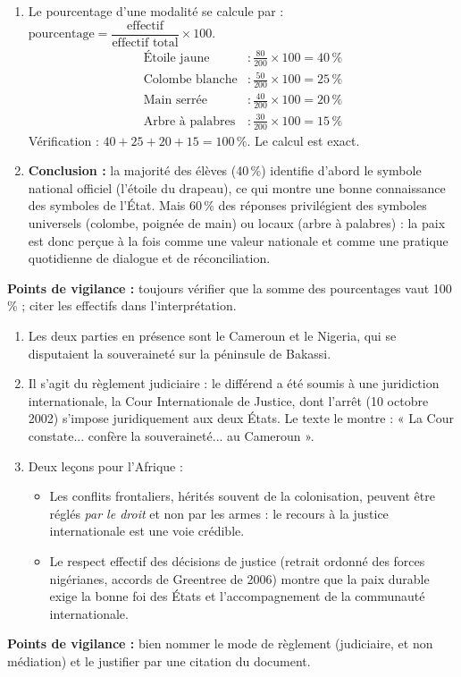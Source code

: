\documentclass[11pt]{article}
\newcommand{\cle}[1]{{\popxbold\color{popdark}#1}}
\begin{document}
\begin{corrige}
\begin{enumerate}
\item Le pourcentage d'une modalité se calcule par : $\text{pourcentage} = \dfrac{\text{effectif}}{\text{effectif total}} \times 100$.
\begin{align*}
\text{Étoile jaune} &: \frac{80}{200} \times 100 = 40\,\% \\
\text{Colombe blanche} &: \frac{50}{200} \times 100 = 25\,\% \\
\text{Main serrée} &: \frac{40}{200} \times 100 = 20\,\% \\
\text{Arbre à palabres} &: \frac{30}{200} \times 100 = 15\,\%
\end{align*}
Vérification : $40 + 25 + 20 + 15 = 100\,\%$. Le calcul est exact.
\item \textbf{Conclusion :} la majorité des élèves (40\,\%) identifie d'abord le symbole national officiel (l'étoile du drapeau), ce qui montre une bonne connaissance des symboles de l'État. Mais 60\,\% des réponses privilégient des symboles universels (colombe, poignée de main) ou locaux (arbre à palabres) : la paix est donc perçue à la fois comme une valeur nationale et comme une pratique quotidienne de dialogue et de réconciliation.
\end{enumerate}
\textbf{Points de vigilance :} toujours vérifier que la somme des pourcentages vaut 100\,\% ; citer les effectifs dans l'interprétation.
\end{corrige}

\begin{corrige}
\begin{enumerate}
\item Les deux parties en présence sont le \cle{Cameroun} et le \cle{Nigeria}, qui se disputaient la souveraineté sur la péninsule de Bakassi.
\item Il s'agit du \cle{règlement judiciaire} : le différend a été soumis à une juridiction internationale, la Cour Internationale de Justice, dont l'arrêt (10 octobre 2002) s'impose juridiquement aux deux États. Le texte le montre : « La Cour constate... confère la souveraineté... au Cameroun ».
\item Deux leçons pour l'Afrique :
\begin{itemize}
\item Les conflits frontaliers, hérités souvent de la colonisation, peuvent être réglés \emph{par le droit} et non par les armes : le recours à la justice internationale est une voie crédible.
\item Le respect effectif des décisions de justice (retrait ordonné des forces nigérianes, accords de Greentree de 2006) montre que la paix durable exige la bonne foi des États et l'accompagnement de la communauté internationale.
\end{itemize}
\end{enumerate}
\textbf{Points de vigilance :} bien nommer le mode de règlement (judiciaire, et non médiation) et le justifier par une citation du document.
\end{corrige}
\end{document}
